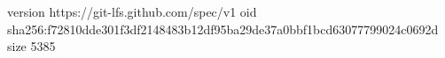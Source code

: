 version https://git-lfs.github.com/spec/v1
oid sha256:f72810dde301f3df2148483b12df95ba29de37a0bbf1bcd63077799024c0692d
size 5385
